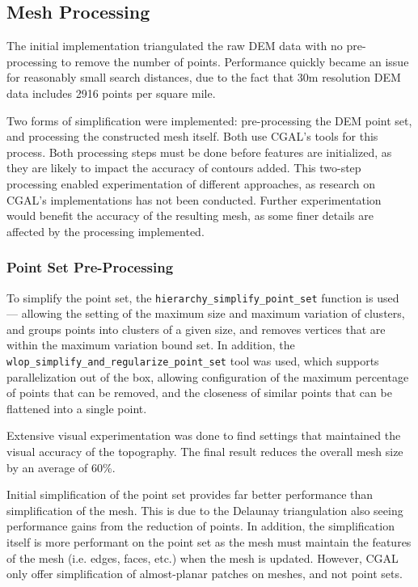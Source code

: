 \documentclass[12pt]{article}
\begin{document}
\subsection{Mesh Processing}\label{section:impl:meshProcessing}

The initial implementation triangulated the raw DEM data with no pre-processing to remove the number of points. Performance quickly became an issue for reasonably small search distances, due to the fact that 30m resolution DEM data includes 2916 points per square mile.

Two forms of simplification were implemented: pre-processing the DEM point set, and processing the constructed mesh itself. Both use CGAL's tools for this process. Both processing steps must be done before features are initialized, as they are likely to impact the accuracy of contours added. This two-step processing enabled experimentation of different approaches, as research on CGAL's implementations has not been conducted. Further experimentation would benefit the accuracy of the resulting mesh, as some finer details are affected by the processing implemented.

\subsubsection{Point Set Pre-Processing}

To simplify the point set, the \texttt{hierarchy\_simplify\_point\_set} function is used --- allowing the setting of the maximum size and maximum variation of clusters, and groups points into clusters of a given size, and removes vertices that are within the maximum variation bound set. In addition, the \texttt{wlop\_simplify\_and\_regularize\_point\_set} tool was used, which supports parallelization out of the box, allowing configuration of the maximum percentage of points that can be removed, and the closeness of similar points that can be flattened into a single point.

Extensive visual experimentation was done to find settings that maintained the visual accuracy of the topography. The final result reduces the overall mesh size by an average of 60\%.

Initial simplification of the point set provides far better performance than simplification of the mesh. This is due to the Delaunay triangulation also seeing performance gains from the reduction of points. In addition, the simplification itself is more performant on the point set as the mesh must maintain the features of the mesh (i.e. edges, faces, etc.) when the mesh is updated. However, CGAL only offer simplification of almost-planar patches on meshes, and not point sets.
\end{document}
